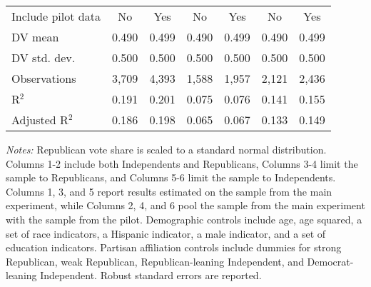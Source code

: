 \begin{table}[!htbp]
\begin{threeparttable}
\begin{tabular}{@{\hspace{5pt}}l@{\hspace{5pt}}cccccc}
\midrule
Include pilot data & No & Yes & No & Yes & No & Yes \\
\addlinespace
DV mean & 0.490 & 0.499 & 0.490 & 0.499 & 0.490 & 0.499 \\
DV std. dev. & 0.500 & 0.500 & 0.500 & 0.500 & 0.500 & 0.500 \\
Observations & 3,709 & 4,393 & 1,588 & 1,957 & 2,121 & 2,436 \\ 
R$^{2}$ & 0.191 & 0.201 & 0.075 & 0.076 & 0.141 & 0.155 \\ 
Adjusted R$^{2}$ & 0.186 & 0.198 & 0.065 & 0.067 & 0.133 & 0.149 \\ 
\bottomrule 
\end{tabular} 
\begin{tablenotes}
\footnotesize
\item \textit{Notes:} Republican vote share is scaled to a standard normal distribution. Columns 1-2 include both Independents and Republicans, Columns 3-4 limit the sample to Republicans, and Columns 5-6 limit the sample to Independents. Columns 1, 3, and 5 report results estimated on the sample from the main experiment, while Columns 2, 4, and 6 pool the sample from the main experiment with the sample from the pilot. Demographic controls include age, age squared, a set of race indicators, a Hispanic indicator, a male indicator, and a set of education indicators. Partisan affiliation controls include dummies for strong Republican, weak Republican, Republican-leaning Independent, and Democrat-leaning Independent. Robust standard errors are reported.
\end{tablenotes}
\end{threeparttable}
\end{table} 
